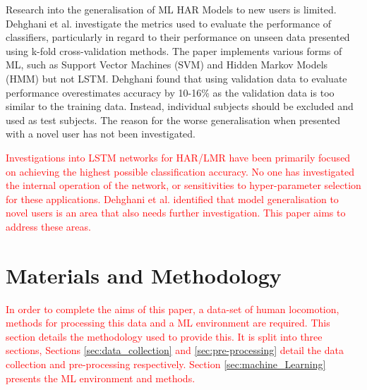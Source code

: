 \documentclass[sensors,article,submit,moreauthors,pdftex]{Definitions/mdpi}
\begin{document}
Research into the generalisation of ML HAR Models to new users is limited. Dehghani et al. investigate the metrics used to evaluate the performance of classifiers, particularly in regard to their performance on unseen data presented using k-fold cross-validation methods\cite{Dehghani2019}. The paper implements various forms of ML, such as Support Vector Machines (SVM) and Hidden Markov Models (HMM) but not LSTM. Dehghani found that using validation data to evaluate performance overestimates accuracy by 10-16\% as the validation data is too similar to the training data. Instead, individual subjects should be excluded and used as test subjects. The reason for the worse generalisation when presented with a novel user has not been investigated.

\textcolor{red}{Investigations into LSTM networks for HAR/LMR have been primarily focused on achieving the highest possible classification accuracy. No one has investigated the internal operation of the network, or sensitivities to hyper-parameter selection for these applications. Dehghani et al. identified that model generalisation to novel users is an area that also needs further investigation\cite{Dehghani2019}. This paper aims to address these areas.}

\section{Materials and Methodology}
\label{sec:materials_and_methdology}
\textcolor{red}{In order to complete the aims of this paper, a data-set of human locomotion, methods for processing this data and a ML environment are required. This section details the methodology used to provide this. It is split into three sections, Sections \ref{sec:data_collection} and \ref{sec:pre-processing} detail the data collection and pre-processing respectively. Section \ref{sec:machine_Learning} presents the ML environment and methods.}
\end{document}
